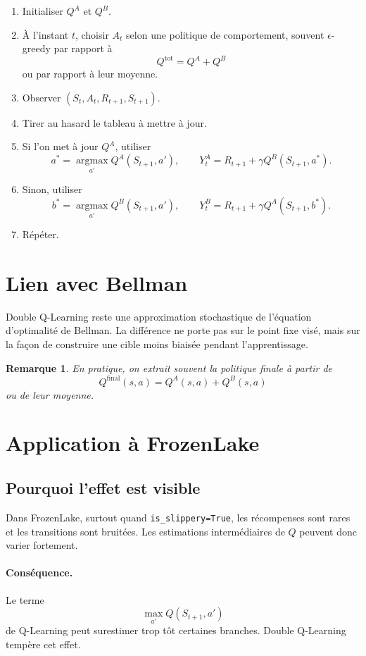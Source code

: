 \documentclass[11pt,a4paper]{article}
\newtheorem*{remarque}{Remarque}
\newcommand{\argmax}{\operatorname*{argmax}}
\begin{document}
\begin{enumerate}[leftmargin=1.8em]
    \item Initialiser $Q^A$ et $Q^B$.
    \item À l'instant $t$, choisir $A_t$ selon une politique de comportement, souvent $\epsilon$-greedy par rapport à
    \[
    Q^{\text{tot}} = Q^A+Q^B
    \]
    ou par rapport à leur moyenne.
    \item Observer $(S_t,A_t,R_{t+1},S_{t+1})$.
    \item Tirer au hasard le tableau à mettre à jour.
    \item Si l'on met à jour $Q^A$, utiliser
    \[
    a^*=\argmax_{a'}Q^A(S_{t+1},a'), \qquad
    Y_t^A=R_{t+1}+\gamma Q^B(S_{t+1},a^*).
    \]
    \item Sinon, utiliser
    \[
    b^*=\argmax_{a'}Q^B(S_{t+1},a'), \qquad
    Y_t^B=R_{t+1}+\gamma Q^A(S_{t+1},b^*).
    \]
    \item Répéter.
\end{enumerate}

\section{Lien avec Bellman}

Double Q-Learning reste une approximation stochastique de l'équation d'optimalité de Bellman. La différence ne porte pas sur le point fixe visé, mais sur la façon de construire une cible moins biaisée pendant l'apprentissage.

\begin{remarque}
En pratique, on extrait souvent la politique finale à partir de
\[
Q^{\text{final}}(s,a)=Q^A(s,a)+Q^B(s,a)
\]
ou de leur moyenne.
\end{remarque}

\section{Application à FrozenLake}

\subsection{Pourquoi l'effet est visible}

Dans FrozenLake, surtout quand \texttt{is\_slippery=True}, les récompenses sont rares et les transitions sont bruitées. Les estimations intermédiaires de $Q$ peuvent donc varier fortement.

\paragraph{Conséquence.}
Le terme
\[
\max_{a'}Q(S_{t+1},a')
\]
de Q-Learning peut surestimer trop tôt certaines branches. Double Q-Learning tempère cet effet.
\end{document}
